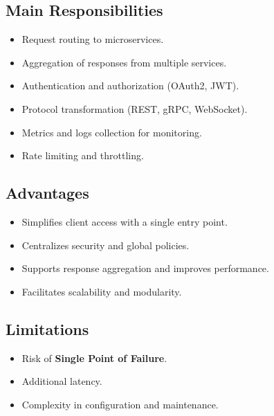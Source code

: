 \documentclass[a4paper,11pt]{article}
\begin{document}
\subsection*{Main Responsibilities}
\begin{itemize}
    \item Request routing to microservices.
    \item Aggregation of responses from multiple services.
    \item Authentication and authorization (OAuth2, JWT).
    \item Protocol transformation (REST, gRPC, WebSocket).
    \item Metrics and logs collection for monitoring.
    \item Rate limiting and throttling.
\end{itemize}

\subsection*{Advantages}
\begin{itemize}
    \item Simplifies client access with a single entry point.
    \item Centralizes security and global policies.
    \item Supports response aggregation and improves performance.
    \item Facilitates scalability and modularity.
\end{itemize}

\subsection*{Limitations}
\begin{itemize}
    \item Risk of \textbf{Single Point of Failure}.
    \item Additional latency.
    \item Complexity in configuration and maintenance.
\end{itemize}
\end{document}
